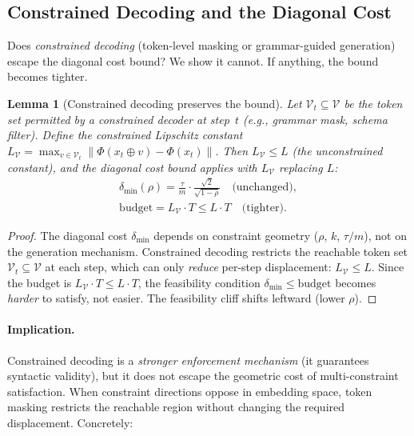 \documentclass{article}
\theoremstyle{plain}
\newtheorem{lemma}[theorem]{Lemma}
\theoremstyle{definition}
\theoremstyle{remark}
\begin{document}
\subsection{Constrained Decoding and the Diagonal Cost}\label{app:constrained_decoding}

Does \emph{constrained decoding} (token-level masking or grammar-guided generation) escape the diagonal cost bound? We show it cannot. If anything, the bound becomes tighter.

\begin{lemma}[Constrained decoding preserves the bound]\label{lem:constrained_decoding}
Let $\mathcal{V}_t \subseteq \mathcal{V}$ be the token set permitted by a constrained decoder at step~$t$ (e.g., grammar mask, schema filter). Define the constrained Lipschitz constant
$L_{\mathcal{V}} = \max_{v \in \mathcal{V}_t} \|\Phi(x_t \oplus v) - \Phi(x_t)\|$.
Then $L_{\mathcal{V}} \le L$ (the unconstrained constant), and the diagonal cost bound applies with $L_{\mathcal{V}}$ replacing $L$:
\begin{gather*}
\delta_{\min}(\rho) = \frac{\tau}{m} \cdot \frac{\sqrt{2}}{\sqrt{1-\rho}} \quad \text{(unchanged)},\\
\text{budget} = L_{\mathcal{V}} \cdot T \le L \cdot T \quad \text{(tighter)}.
\end{gather*}
\end{lemma}

\begin{proof}
The diagonal cost $\delta_{\min}$ depends on constraint geometry ($\rho$, $k$, $\tau/m$), not on the generation mechanism. Constrained decoding restricts the reachable token set $\mathcal{V}_t \subseteq \mathcal{V}$ at each step, which can only \emph{reduce} per-step displacement: $L_{\mathcal{V}} \le L$. Since the budget is $L_{\mathcal{V}} \cdot T \le L \cdot T$, the feasibility condition $\delta_{\min} \le \text{budget}$ becomes \emph{harder} to satisfy, not easier. The feasibility cliff shifts leftward (lower $\rho$).
\end{proof}

\paragraph{Implication.} Constrained decoding is a \emph{stronger enforcement mechanism} (it guarantees syntactic validity), but it does not escape the geometric cost of multi-constraint satisfaction. When constraint directions oppose in embedding space, token masking restricts the reachable region without changing the required displacement. Concretely:
\end{document}
